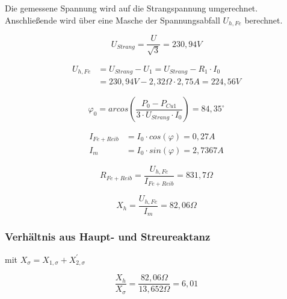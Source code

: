 \documentclass[conference]{IEEEtran}
\begin{document}
Die gemessene Spannung wird auf die Strangspannung umgerechnet.
Anschließende wird über eine Masche der Spannungsabfall $U_{h, Fe}$
berechnet.

\begin{equation}
    U_{Strang} = \dfrac{U}{ \sqrt{3} } = 230,94\si{V}
\end{equation}

\begin{align} \label{eq:UhFe}
    U_{h, Fe} & = U_{Strang} - U_{1} = U_{Strang} - R_{1} \cdot I_{0}        \\
              & = 230,94\si{V} - 2,32 \Omega \cdot 2,75\si{A} = 224,56\si{V}
\end{align}


\begin{equation}
    \varphi_{0} = arcos\left( \dfrac{P_{0} - P_{Cu1} }{3 \cdot U_{Strang} \cdot I_{0} }\right) = 84,35^\circ
\end{equation}


\begin{align*}
    I_{Fe+Reib} & = I_{0} \cdot cos( \varphi ) = 0,27\si{A}   \\
    I_{m}       & = I_{0} \cdot sin( \varphi ) = 2,7367\si{A}
\end{align*}

\begin{equation}
    R_{Fe+Reib} = \dfrac{ U_{h, Fe} }{ I_{Fe+Reib} } = 831,7 \Omega
\end{equation}

\begin{equation}
    X_{h} = \dfrac{ U_{h, Fe} }{ I_{m} } = 82,06 \Omega
\end{equation}

\subsubsection{Verhältnis aus Haupt- und Streureaktanz}

mit $X_{ \sigma } =  X_{1, \sigma } + X_{2, \sigma }^\prime$

\begin{equation}
    \dfrac{ X_{h}}{X_{ \sigma }} = \dfrac{ 82,06 \Omega }{ 13,652 \Omega } = 6,01
\end{equation}
\end{document}
